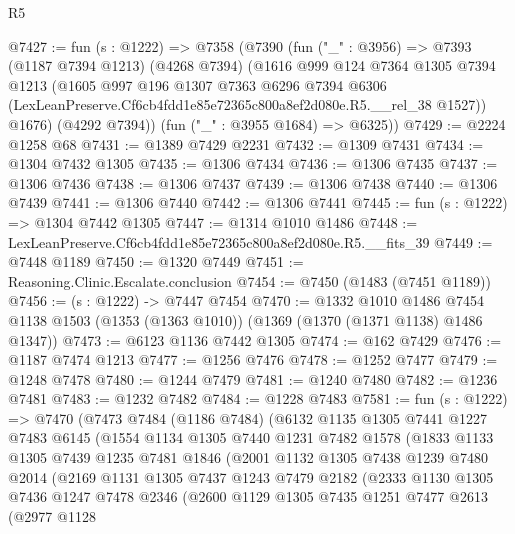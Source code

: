 \begin{lexlean}{R5}
\begin{coremodule}
@7427 := fun (s : @1222) =>
  @7358
    (@7390
      (fun ("_" : @3956) =>
      @7393
        (@1187 @7394 @1213)
        (@4268 @7394)
        (@1616
          @999
          @124
          @7364
          @1305
          @7394
          @1213
          (@1605
            @997
            @196
            @1307
            @7363
            @6296
            @7394
            @6306
            (LexLeanPreserve.Cf6cb4fdd1e85e72365c800a8ef2d080e.R5.__rel_38 @1527))
          @1676)
        (@4292 @7394))
      (fun ("_" : @3955 @1684) => @6325))
@7429 := @2224 @1258 @68
@7431 := @1389 @7429 @2231
@7432 := @1309 @7431
@7434 := @1304 @7432 @1305
@7435 := @1306 @7434
@7436 := @1306 @7435
@7437 := @1306 @7436
@7438 := @1306 @7437
@7439 := @1306 @7438
@7440 := @1306 @7439
@7441 := @1306 @7440
@7442 := @1306 @7441
@7445 := fun (s : @1222) => @1304 @7442 @1305
@7447 := @1314 @1010 @1486
@7448 := LexLeanPreserve.Cf6cb4fdd1e85e72365c800a8ef2d080e.R5.__fits_39
@7449 := @7448 @1189
@7450 := @1320 @7449
@7451 := Reasoning.Clinic.Escalate.conclusion
@7454 := @7450 (@1483 (@7451 @1189))
@7456 := (s : @1222) -> @7447 @7454
@7470 := @1332
    @1010
    @1486
    @7454
    @1138
    @1503
    (@1353 (@1363 @1010))
    (@1369 (@1370 (@1371 @1138) @1486 @1347))
@7473 := @6123 @1136 @7442 @1305
@7474 := @162 @7429
@7476 := @1187 @7474 @1213
@7477 := @1256 @7476
@7478 := @1252 @7477
@7479 := @1248 @7478
@7480 := @1244 @7479
@7481 := @1240 @7480
@7482 := @1236 @7481
@7483 := @1232 @7482
@7484 := @1228 @7483
@7581 := fun (s : @1222) =>
  @7470
    (@7473
      @7484
      (@1186 @7484)
      (@6132
        @1135
        @1305
        @7441
        @1227
        @7483
        @6145
        (@1554
          @1134
          @1305
          @7440
          @1231
          @7482
          @1578
          (@1833
            @1133
            @1305
            @7439
            @1235
            @7481
            @1846
            (@2001
              @1132
              @1305
              @7438
              @1239
              @7480
              @2014
              (@2169
                @1131
                @1305
                @7437
                @1243
                @7479
                @2182
                (@2333
                  @1130
                  @1305
                  @7436
                  @1247
                  @7478
                  @2346
                  (@2600
                    @1129
                    @1305
                    @7435
                    @1251
                    @7477
                    @2613
                    (@2977
                      @1128

\end{coremodule}
\end{lexlean}
